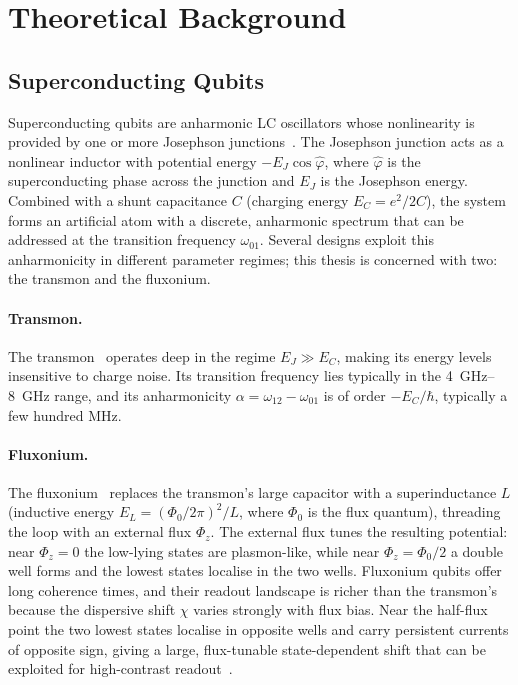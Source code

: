 \section{Theoretical Background}
\label{sec:background}

\subsection{Superconducting Qubits}
\label{subsec:sc_qubits}

Superconducting qubits are anharmonic LC oscillators whose nonlinearity is
provided by one or more Josephson junctions~\cite{Krantz2019}.  The Josephson
junction acts as a nonlinear inductor with potential energy $-E_J\cos\hat{\varphi}$, where
$\hat{\varphi}$ is the superconducting phase across the junction and $E_J$ is the
Josephson energy.  Combined with a shunt capacitance $C$ (charging energy
$E_C = e^2/2C$), the system forms an artificial atom with a discrete, anharmonic
spectrum that can be addressed at the transition frequency $\omega_{01}$. Several designs exploit this anharmonicity in different parameter regimes; this thesis is concerned with two: the transmon and the fluxonium.

\paragraph{Transmon.}
The transmon~\cite{Koch2007} operates deep in the regime $E_J \gg E_C$, making
its energy levels insensitive to charge noise.  Its transition frequency lies
typically in the \SIrange{4}{8}{\giga\hertz} range, and its anharmonicity
$\alpha = \omega_{12} - \omega_{01}$ is of order $-E_C/\hbar$, typically a few
hundred \si{\mega\hertz}.

\paragraph{Fluxonium.}
The fluxonium~\cite{Manucharyan2009} replaces the transmon's large capacitor with a
superinductance $L$ (inductive energy $E_L = (\Phi_0/2\pi)^2/L$, where $\Phi_0$ is
the flux quantum), threading the loop with an external flux $\Phi_z$.  The external
flux tunes the resulting potential: near $\Phi_z = 0$ the low-lying states are
plasmon-like, while near $\Phi_z = \Phi_0/2$ a double well forms and the lowest
states localise in the two wells.  Fluxonium qubits offer long coherence times, and
their readout landscape is richer than the transmon's because the dispersive shift
$\chi$ varies strongly with flux bias.  Near the half-flux point the two lowest
states localise in opposite wells and carry persistent currents of opposite sign,
giving a large, flux-tunable state-dependent shift that can be exploited for
high-contrast readout~\cite{Manucharyan2009}.


